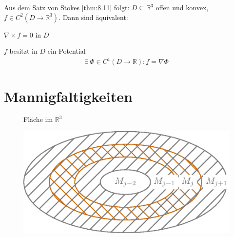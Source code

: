 \documentclass[a4paper,10pt]{scrbook}
\begin{document}
\begin{notice*}
  Aus dem Satz von Stokes \ref{thm:8.11} folgt: $D \subseteq \mathbb{R}^3$ offen und konvex, $f \in C^2(D \to \mathbb{R}^3)$. Dann sind äquivalent:
  \begin{enum-roman}
    \item $\nabla \times f = 0$ in $D$

    \item $f$ besitzt in $D$ ein Potential
    \begin{align*}
      \exists \, \Phi \in C^1(D \to \mathbb{R}) : f = \nabla \Phi
    \end{align*}
  \end{enum-roman}
\end{notice*}

%
%

\section{Mannigfaltigkeiten} 
\addtocounter{thmn}{1}
\setcounter{theorem}{0}


\begin{figure}[H]
  Fläche im $\mathbb{R}^3$

  \centering
  \includegraphics[scale=0.2]{images/ana3-tmp-72}
\end{figure}
\end{document}
